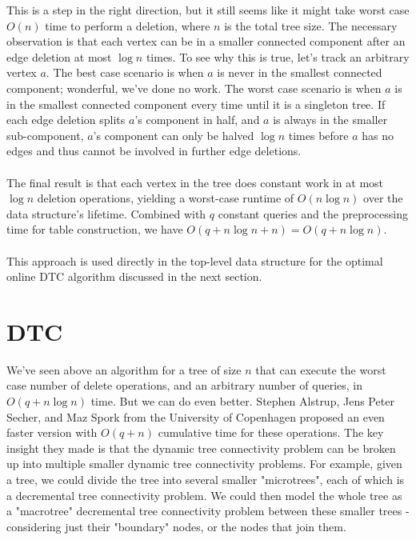 \documentclass{article}
\begin{document}
This is a step in the right direction, but it still seems like it might take worst case $O(n)$ time to perform a deletion, where $n$ is the total tree size. The necessary observation is that each vertex can be in a smaller connected component after an edge deletion at most $\log n$ times. To see why this is true, let's track an arbitrary vertex $a$. The best case scenario is when $a$ is never in the smallest connected component; wonderful, we've done no work. The worst case scenario is when $a$ is in the smallest connected component every time until it is a singleton tree. If each edge deletion splits $a$'s component in half, and $a$ is always in the smaller sub-component, $a$'s component can only be halved $\log n$ times before $a$ has no edges and thus cannot be involved in further edge deletions. \\ \\
The final result is that each vertex in the tree does constant work in at most $\log n$ deletion operations, yielding a worst-case runtime of $O(n \log n)$ over the data structure's lifetime. Combined with $q$ constant queries and the preprocessing time for table construction, we have $O(q + n \log n + n) = O(q + n \log n)$. \\ \\
This approach is used directly in the top-level data structure for the optimal online DTC algorithm discussed in the next section.

\section{DTC}
We've seen above an algorithm for a tree of size $n$ that can execute the worst case number of delete operations, and an arbitrary number of queries, in $O(q + n \log n)$ time.  But we can do even better.  Stephen Alstrup, Jens Peter Secher, and Maz Spork from the University of Copenhagen proposed an even faster version with $O(q + n)$ cumulative time for these operations.  The key insight they made is that the dynamic tree connectivity problem can be broken up into multiple smaller dynamic tree connectivity problems.  For example, given a tree, we could divide the tree into several smaller "microtrees", each of which is a decremental tree connectivity problem.  We could then model the whole tree as a "macrotree" decremental tree connectivity problem between these smaller trees - considering just their "boundary" nodes, or the nodes that join them.
\end{document}

